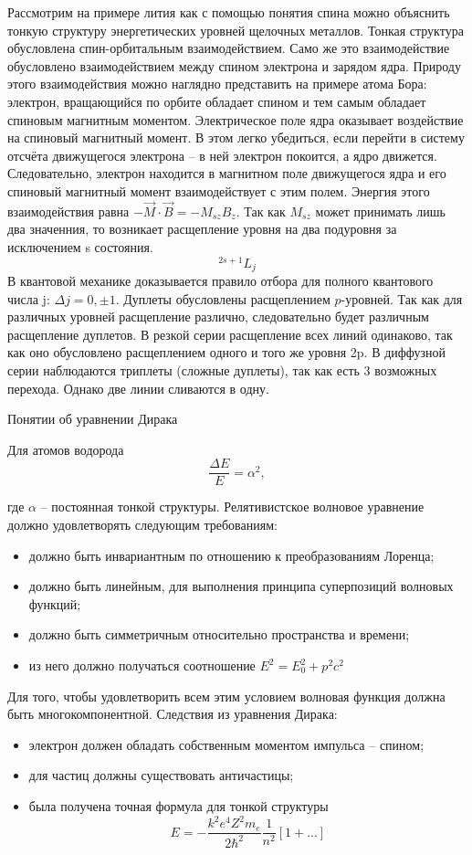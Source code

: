 Рассмотрим на примере лития как с помощью понятия спина можно объяснить тонкую структуру энергетических уровней щелочных металлов. Тонкая структура обусловлена спин-орбитальным взаимодействием. Само же это взаимодействие обусловлено взаимодействием между спином электрона и зарядом ядра. Природу этого взаимодействия можно наглядно представить на примере атома Бора: электрон, вращающийся по орбите обладает спином и тем самым обладает спиновым магнитным моментом. Электрическое поле ядра оказывает воздействие на спиновый магнитный момент. В этом легко убедиться, если перейти в систему отсчёта движущегося электрона -- в ней электрон покоится, а ядро движется. Следовательно, электрон находится в магнитном поле движущегося ядра и его спиновый магнитный момент взаимодействует с этим полем. Энергия этого взаимодействия равна \( -\vec{M}\cdot\vec{B} = -M_{sz}B_z \). Так как \( M_{sz} \) может принимать лишь два значенния, то возникает расщепление уровня на два подуровня за исключением s состояния.
\[
  ^{2s+1}L_j
\]
В квантовой механике доказывается правило отбора для полного квантового числа j: \( \Delta j = 0, \pm1 \).
Дуплеты обусловлены расщеплением \(p\)-уровней. Так как для различных уровней расщепление различно, следовательно будет различным расщепление дуплетов.
В резкой серии расщепление всех линий одинаково, так как оно обусловлено расщеплением одного и того же уровня 2p.
В диффузной серии наблюдаются триплеты (сложные дуплеты), так как есть 3 возможных перехода. Однако две линии сливаются в одну.

Понятии об уравнении Дирака

Для атомов водорода
\[
    \frac{\Delta E}{E} = \alpha^2,
\]

где \( \alpha \) -- постоянная тонкой структуры.
Релятивистское волновое уравнение должно удовлетворять следующим требованиям:
\begin{itemize}
\item должно быть инвариантным по отношению к преобразованиям Лоренца;
\item должно быть линейным, для выполнения принципа суперпозиций волновых функций;
\item должно быть симметричным относительно пространства и времени;
\item из него должно получаться соотношение \( E^2 = E_0^2 + p^2c^2 \)
\end{itemize}

Для того, чтобы удовлетворить всем этим условием волновая функция должна быть многокомпонентной.
Следствия из уравнения Дирака:
\begin{itemize}
\item электрон должен обладать собственным моментом импульса -- спином;
\item для частиц должны существовать античастицы;
\item была получена точная формула для тонкой структуры \[ E = -\frac{k^2e^4Z^2m_e}{2\hbar^2}\frac{1}{n^2}[1+...] \] 
\end{itemize}

